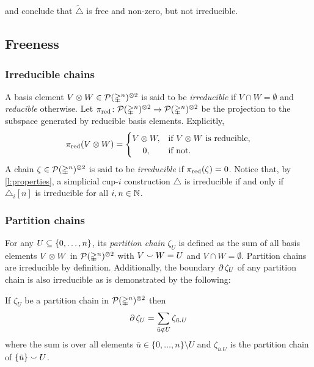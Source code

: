 \medskip\noindent and conclude that $\widetilde\triangle$ is free and non-zero, but not irreducible.

\subsection{Freeness}

\subsubsection{Irreducible chains}

A basis element $V \otimes W \in \mathcal{P}(\mathbb{\Delta}^n)^{\otimes 2}$ is said to be \textit{irreducible} if $V \cap W = \emptyset$ and \textit{reducible} otherwise.
Let $\operatorname{\pi_{\text{red}}} \colon \mathcal{P}(\mathbb{\Delta}^n)^{\otimes 2} \to \mathcal{P}(\mathbb{\Delta}^n)^{\otimes 2}$ be the projection to the subspace generated by reducible basis elements.
Explicitly,
\[
\pired(V \ot W) =
\begin{cases}
	V \ot W, & \text{if $V \ot W$ is reducible},\\
	\hfil 0, & \text{if not}.
\end{cases}
\]
A chain $\zeta \in \mathcal{P}(\mathbb{\Delta}^n)^{\otimes 2}$ is said to be \textit{irreducible} if $\operatorname{\pi_{\text{red}}}(\zeta) = 0$.
Notice that, by \cref{l:properties}, a simplicial \mbox{cup-$i$} construction $\triangle$ is irreducible if and only if $\triangle_i[n]$ is irreducible for all $i, n \in \mathbb{N}$.

\subsubsection{Partition chains}

For any $U \subseteq \{0,\dots,n\}$, its \textit{partition chain} $\zeta_U$ is defined as the sum of all basis elements $V \otimes W$ in $\mathcal{P}(\mathbb{\Delta}^n)^{\otimes 2}$ with $V \union W = U$ and $V \cap W = \emptyset$.
Partition chains are irreducible by definition.
Additionally, the boundary $\operatorname{\partial} \zeta_U$ of any partition chain is also irreducible as is demonstrated by the following:

\begin{lemma}\label{l:partition chains}
	If $\zeta_U$ be a partition chain in $\mathcal{P}(\mathbb{\Delta}^n)^{\otimes 2}$ then
	\[
	\operatorname{\partial} \zeta_U = \sum_{\bar u \notin U} \zeta_{\bar u.U}
	\]
	where the sum is over all elements $\bar u \in \{0,\dots,n\} \setminus U$ and $\zeta_{\bar u.U}$ is the partition chain of $\set{\bar u} \union U$.
\end{lemma}

